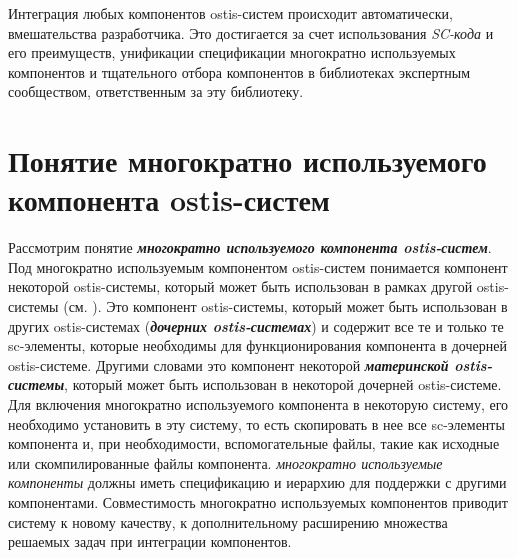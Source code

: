 Интеграция любых компонентов ostis-систем происходит автоматически,  вмешательства разработчика. Это достигается за счет использования \textit{SC-кода} и его преимуществ, унификации спецификации многократно используемых компонентов и тщательного отбора компонентов в библиотеках экспертным сообществом, ответственным за эту библиотеку.

\section{Понятие многократно используемого компонента ostis-систем}
\label{reusable_component_section}

Рассмотрим понятие \textbf{\textit{многократно используемого компонента ostis-систем}}. Под многократно используемым компонентом ostis-систем понимается компонент некоторой ostis-системы, который может быть использован в рамках другой ostis-системы (см. ). Это компонент ostis-системы, который может быть использован в других ostis-системах (\textbf{\textit{дочерних ostis-системах}}) и содержит все те и только те sc-элементы, которые необходимы для функционирования компонента в дочерней ostis-системе. Другими словами это компонент некоторой \textbf{\textit{материнской ostis-системы}}, который может быть использован в некоторой дочерней ostis-системе. Для включения многократно используемого компонента в некоторую систему, его необходимо установить в эту систему, то есть скопировать в нее все sc-элементы компонента и, при необходимости, вспомогательные файлы, такие как исходные или скомпилированные файлы компонента. \textit{многократно используемые компоненты} должны иметь  спецификацию и иерархию для поддержки  с другими компонентами. Совместимость многократно используемых компонентов приводит систему к новому качеству, к дополнительному расширению множества решаемых задач при интеграции компонентов.


